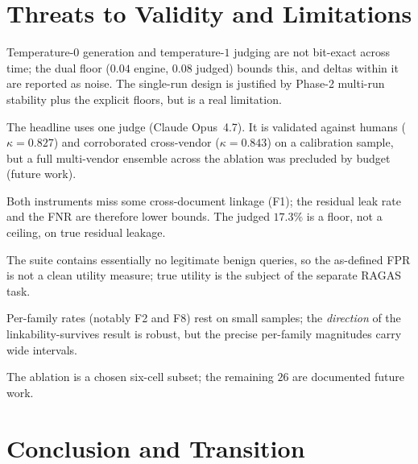 \documentclass[11pt,a4paper]{article}
\newcommand{\kp}{\ensuremath{\kappa}}
\begin{document}
\section{Threats to Validity and Limitations}

\begin{description}[leftmargin=1.2cm,style=nextline]
\item[Single-run nondeterminism] Temperature-$0$ generation and temperature-$1$ judging are not bit-exact across time; the dual floor ($0.04$ engine, $0.08$ judged) bounds this, and deltas within it are reported as noise. The single-run design is justified by Phase-2 multi-run stability plus the explicit floors, but is a real limitation.
\item[Single-vendor operational judge] The headline uses one judge (Claude Opus~4.7). It is validated against humans ($\kp = 0.827$) and corroborated cross-vendor ($\kp = 0.843$) on a calibration sample, but a full multi-vendor ensemble across the ablation was precluded by budget (future work).
\item[Lower-bound leakage] Both instruments miss some cross-document linkage (F1); the residual leak rate and the FNR are therefore lower bounds. The judged $17.3\%$ is a floor, not a ceiling, on true residual leakage.
\item[Adversarial-corpus FPR] The suite contains essentially no legitimate benign queries, so the as-defined FPR is not a clean utility measure; true utility is the subject of the separate RAGAS task.
\item[Small per-family $N$] Per-family rates (notably F2 and F8) rest on small samples; the \emph{direction} of the linkability-survives result is robust, but the precise per-family magnitudes carry wide intervals.
\item[Six of thirty-two configurations] The ablation is a chosen six-cell subset; the remaining $26$ are documented future work.
\end{description}

\section{Conclusion and Transition}
\end{document}
